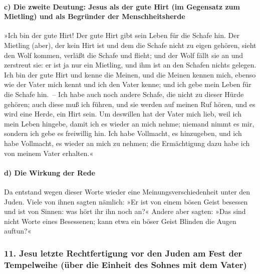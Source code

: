 \hypertarget{c-die-zweite-deutung-jesus-als-der-gute-hirt-im-gegensatz-zum-mietling-und-als-begruxfcnder-der-menschheitsherde}{%
\paragraph{c) Die zweite Deutung: Jesus als der gute Hirt (im Gegensatz
zum Mietling) und als Begründer der
Menschheitsherde}\label{c-die-zweite-deutung-jesus-als-der-gute-hirt-im-gegensatz-zum-mietling-und-als-begruxfcnder-der-menschheitsherde}}

 »Ich bin der gute Hirt! Der gute Hirt gibt sein Leben
für die Schafe hin.  Der Mietling (aber), der kein Hirt
ist und dem die Schafe nicht zu eigen gehören, sieht den Wolf kommen,
verläßt die Schafe und flieht; und der Wolf fällt sie an und zerstreut
sie:  er ist ja nur ein Mietling, und ihm ist an den
Schafen nichts gelegen.  Ich bin der gute Hirt und kenne
die Meinen, und die Meinen kennen mich,  ebenso wie der
Vater mich kennt und ich den Vater kenne; und ich gebe mein Leben für
die Schafe hin.~--  Ich habe auch noch andere Schafe, die
nicht zu dieser Hürde gehören; auch diese muß ich führen, und sie werden
auf meinen Ruf hören, und es wird eine Herde, ein Hirt sein.
 Um deswillen hat der Vater mich lieb, weil ich mein
Leben hingebe, damit ich es wieder an mich nehme; 
niemand nimmt es mir, sondern ich gebe es freiwillig hin. Ich habe
Vollmacht, es hinzugeben, und ich habe Vollmacht, es wieder an mich zu
nehmen; die Ermächtigung dazu habe ich von meinem Vater erhalten.«

\hypertarget{d-die-wirkung-der-rede}{%
\paragraph{d) Die Wirkung der Rede}\label{d-die-wirkung-der-rede}}

 Da entstand wegen dieser Worte wieder eine
Meinungsverschiedenheit unter den Juden.  Viele von ihnen
sagten nämlich: »Er ist von einem bösen Geist besessen und ist von
Sinnen: was hört ihr ihn noch an?«  Andere aber sagten:
»Das sind nicht Worte eines Besessenen; kann etwa ein böser Geist
Blinden die Augen auftun?«

\hypertarget{jesu-letzte-rechtfertigung-vor-den-juden-am-fest-der-tempelweihe-uxfcber-die-einheit-des-sohnes-mit-dem-vater}{%
\subsubsection{11. Jesu letzte Rechtfertigung vor den Juden am Fest der
Tempelweihe (über die Einheit des Sohnes mit dem
Vater)}\label{jesu-letzte-rechtfertigung-vor-den-juden-am-fest-der-tempelweihe-uxfcber-die-einheit-des-sohnes-mit-dem-vater}}

